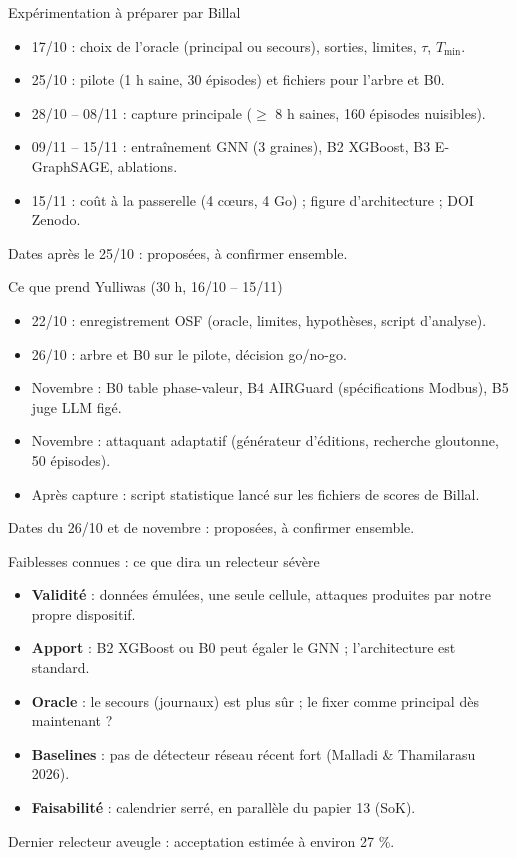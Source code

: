 \documentclass[aspectratio=169,11pt]{beamer}
\newcommand{\rb}[1]{\textcolor{rouge}{#1}}
\newcommand{\bb}[1]{\textcolor{bleu}{#1}}
\begin{document}
\begin{frame}{\rb{Expérimentation à préparer par Billal}}
\begin{itemize}
\item \rb{17/10} : choix de l'oracle (principal ou secours), sorties, limites, $\tau$, $T_{\min}$.
\item \rb{25/10} : pilote (1 h saine, 30 épisodes) et fichiers pour l'arbre et B0.
\item \rb{28/10 -- 08/11} : capture principale ($\geq$ 8 h saines, 160 épisodes nuisibles).
\item \rb{09/11 -- 15/11} : entraînement GNN (3 graines), B2 XGBoost, B3 E-GraphSAGE, ablations.
\item \rb{15/11} : coût à la passerelle (4 cœurs, 4 Go) ; figure d'architecture ; DOI Zenodo.
\end{itemize}
\vspace{1mm}
{\scriptsize Dates après le 25/10 : proposées, à confirmer ensemble.}
\end{frame}

\begin{frame}{\bb{Ce que prend Yulliwas (30 h, 16/10 -- 15/11)}}
\begin{itemize}
\item \bb{22/10} : enregistrement OSF (oracle, limites, hypothèses, script d'analyse).
\item \bb{26/10} : arbre et B0 sur le pilote, décision go/no-go.
\item \bb{Novembre} : B0 table phase-valeur, B4 AIRGuard (spécifications Modbus), B5 juge LLM figé.
\item \bb{Novembre} : attaquant adaptatif (générateur d'éditions, recherche gloutonne, 50 épisodes).
\item \bb{Après capture} : script statistique lancé sur les fichiers de scores de Billal.
\end{itemize}
\vspace{1mm}
{\scriptsize Dates du 26/10 et de novembre : proposées, à confirmer ensemble.}
\end{frame}

\begin{frame}{Faiblesses connues : ce que dira un relecteur sévère}
\begin{itemize}
\item \textbf{Validité} : données émulées, une seule cellule, attaques produites par notre propre dispositif.
\item \textbf{Apport} : B2 XGBoost ou B0 peut égaler le GNN ; l'architecture est standard.
\item \textbf{Oracle} : le secours (journaux) est plus sûr ; le fixer comme principal dès maintenant ?
\item \textbf{Baselines} : pas de détecteur réseau récent fort (Malladi \& Thamilarasu 2026).
\item \textbf{Faisabilité} : calendrier serré, en parallèle du papier 13 (SoK).
\end{itemize}
\vspace{1mm}
{\scriptsize Dernier relecteur aveugle : acceptation estimée à environ 27 \%.}
\end{frame}
\end{document}
